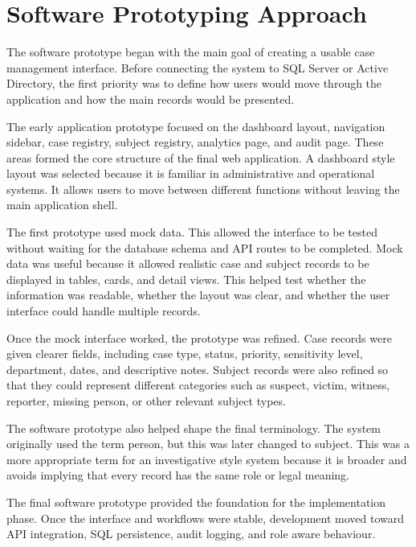 \section{Software Prototyping Approach}

The software prototype began with the main goal of creating a usable case management interface. Before connecting the system to SQL Server or Active Directory, the first priority was to define how users would move through the application and how the main records would be presented.

The early application prototype focused on the dashboard layout, navigation sidebar, case registry, subject registry, analytics page, and audit page. These areas formed the core structure of the final web application. A dashboard style layout was selected because it is familiar in administrative and operational systems. It allows users to move between different functions without leaving the main application shell.

The first prototype used mock data. This allowed the interface to be tested without waiting for the database schema and API routes to be completed. Mock data was useful because it allowed realistic case and subject records to be displayed in tables, cards, and detail views. This helped test whether the information was readable, whether the layout was clear, and whether the user interface could handle multiple records.

Once the mock interface worked, the prototype was refined. Case records were given clearer fields, including case type, status, priority, sensitivity level, department, dates, and descriptive notes. Subject records were also refined so that they could represent different categories such as suspect, victim, witness, reporter, missing person, or other relevant subject types.

The software prototype also helped shape the final terminology. The system originally used the term person, but this was later changed to subject. This was a more appropriate term for an investigative style system because it is broader and avoids implying that every record has the same role or legal meaning.

The final software prototype provided the foundation for the implementation phase. Once the interface and workflows were stable, development moved toward API integration, SQL persistence, audit logging, and role aware behaviour.


